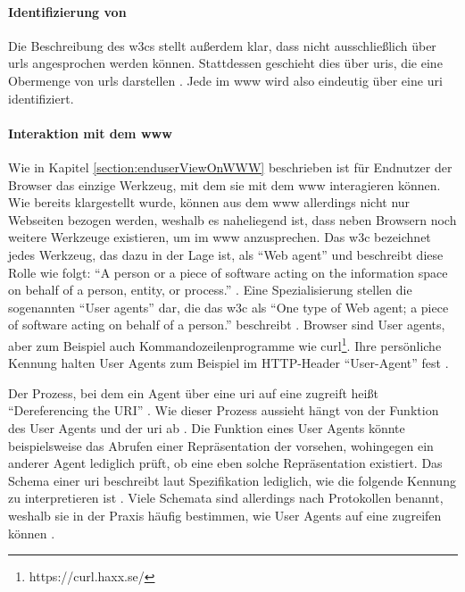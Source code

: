             \paragraph*{Identifizierung von \resources}
            Die Beschreibung des \glspl{w3c} stellt außerdem klar,
            dass {\resources} nicht ausschließlich über \glspl{url} angesprochen werden können.
            Stattdessen geschieht dies über \glspl{uri}, die eine Obermenge von \glspl{url} darstellen
            \cite[Kapitel 1.1.3, Seite 7]{rfc:3986}.
            Jede {\resource} im \gls{www} wird also eindeutig über eine \gls{uri} identifiziert.

            \paragraph*{Interaktion mit dem \gls{www}}
            Wie in Kapitel \ref{section:enduserViewOnWWW} beschrieben ist für Endnutzer
            der Browser das einzige Werkzeug, mit dem sie mit dem \gls{www}
            interagieren können. Wie bereits klargestellt wurde,
            können aus dem \gls{www} allerdings nicht nur Webseiten bezogen werden,
            weshalb es naheliegend ist, dass neben Browsern noch weitere Werkzeuge existieren,
            um {\resources} im \gls{www} anzusprechen.
            Das \gls{w3c} bezeichnet jedes Werkzeug, das dazu in der Lage ist, als
            "`Web agent"' und beschreibt diese Rolle wie folgt:
            "`A person or a piece of software acting on the information
            space on behalf of a person, entity, or process."' \cite[Kapitel 6]{w3c:wwwArch}.
            Eine Spezialisierung stellen die sogenannten "`User agents"' dar,
            die das \gls{w3c} als "`One type of Web agent;
            a piece of software acting on behalf of a person."' beschreibt \cite[Kapitel 6]{w3c:wwwArch}.
            Browser sind User agents, aber zum Beispiel auch Kommandozeilenprogramme
            wie curl\footnote{https://curl.haxx.se/}.
            Ihre persönliche Kennung halten User Agents zum Beispiel im
            HTTP-Header "`User-Agent"' fest \cite[Kapitel 5.5.3, Seite 46]{rfc:7231}.

            Der Prozess, bei dem ein Agent über eine \gls{uri} auf eine {\resource}
            zugreift heißt "`Dereferencing the URI"' \cite[Kapitel 3.1]{w3c:wwwArch}.
            Wie dieser Prozess aussieht hängt von der Funktion des User Agents und der \gls{uri} ab
            \cite[Kapitel 3.1]{w3c:wwwArch}.
            Die Funktion eines User Agents könnte beispielsweise das Abrufen einer
            Repräsentation der {\resource} vorsehen, wohingegen ein anderer Agent
            lediglich prüft, ob eine eben solche Repräsentation existiert.
            Das Schema einer \gls{uri} beschreibt laut Spezifikation
            lediglich, wie die folgende Kennung zu interpretieren ist
            \cite[Kapitel 3.1, Seite 17]{rfc:3986}.
            Viele Schemata sind allerdings nach Protokollen benannt,
            weshalb sie in der Praxis häufig bestimmen,
            wie User Agents auf eine {\resource} zugreifen können
            \cite[Kapitel 3.1]{w3c:wwwArch}.
            
